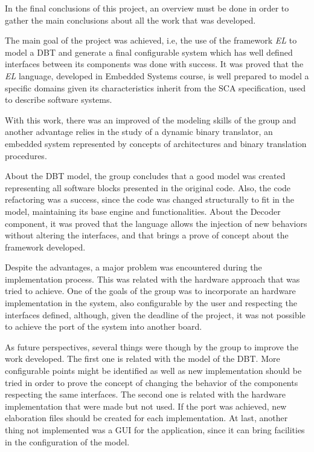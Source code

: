 
In the final conclusions of this project, an overview must be done in order to gather the main conclusions about all the work that was developed. 

The main goal of the project was achieved, i.e, the use of the framework \textit{EL} to model a DBT and generate a final configurable system which has well defined interfaces between its components was done with success. It was proved that the \textit{EL} language, developed in Embedded Systems course, is well prepared to model a specific domains given its characteristics inherit from the SCA specification, used to describe software systems.

With this work, there was an improved of the modeling skills of the group and another advantage relies in the study of a dynamic binary translator, an embedded system represented by concepts of architectures and binary translation procedures. 

About the DBT model, the group concludes that a good model was created representing all software blocks presented in the original code. Also, the code refactoring was a success, since the code was changed structurally to fit in the model, maintaining its base engine and functionalities. About the Decoder component, it was proved that the language allows the injection of new behaviors without altering the interfaces, and that brings a prove of concept about the framework developed.  

Despite the advantages, a major problem was encountered during the implementation process. This was related with the hardware approach that was tried to achieve. One of the goals of the group was to incorporate an hardware implementation in the system, also configurable by the user and respecting the interfaces defined, although, given the deadline of the project, it was not possible to achieve the port of the system into another board.

As future perspectives, several things were though by the group to improve the work developed. The first one is related with the model of the DBT. More configurable points might be identified as well as new implementation should be tried in order to prove the concept of changing the behavior of the components respecting the same interfaces. The second one is related with the hardware implementation that were made but not used. If the port was achieved, new elaboration files should be created for each implementation. At last, another thing not implemented was a GUI for the application, since it can bring facilities in the configuration of the model. 